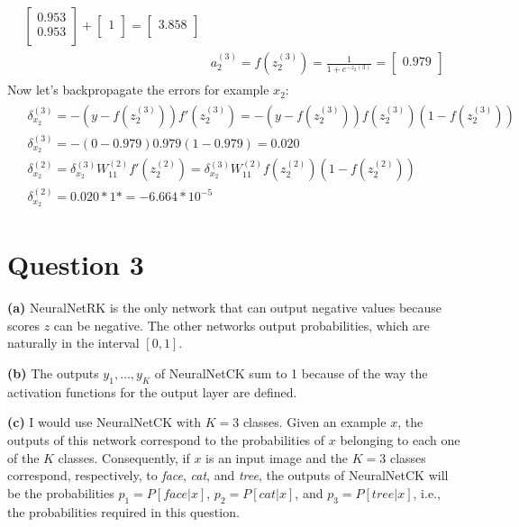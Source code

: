 \documentclass[leqno]{article}
\begin{document}
\begin{gather*}
\begin{split}
 \begin{bmatrix}
   0.953\\
   0.953\\ 
  \end{bmatrix} 
  +
   \begin{bmatrix}
   1\\
  \end{bmatrix}
  =
 \begin{bmatrix}
   3.858\\ 
  \end{bmatrix}
\\
&a_2^{(3)} = f(z_2^{(3)}) = \frac{1}{1 + e^{-z_2{(3)}}} =
 \begin{bmatrix}
   0.979\\ 
  \end{bmatrix}
\end{split}
\end{gather*}
Now let's backpropagate the errors for example $x_2$:
\begin{gather*}
\begin{split}
&\delta_{x_2}^{(3)} = -(y - f(z_2^{(3)}))f'(z_2^{(3)}) = -(y - f(z_2^{(3)}))f(z_2^{(3)})(1 - f(z_2^{(3)}))\\
&\delta_{x_2}^{(3)} = -(0 - 0.979)0.979(1 - 0.979) = 0.020\\
&\delta_{x_2}^{(2)} = \delta_{x_2}^{(3)}W_{11}^{(2)}f'(z_2^{(2)}) = \delta_{x_2}^{(3)}W_{11}^{(2)}f(z_2^{(2)})(1 - f(z_2^{(2)}))\\
&\delta_{x_2}^{(2)} = 0.020*1* = -6.664*10^{-5}
\end{split}
\end{gather*}


\hfill
\section*{Question 3} \textbf{(a)} NeuralNetRK is the only network that can output negative values because scores $z$ can be negative. The other 
networks output probabilities, which are naturally in the interval $[0,1]$.

\hfill

\noindent \textbf{(b)} The outputs $y_1, \ldots, y_K$ of NeuralNetCK sum to 1 because of the way the activation functions for the output layer are defined. 

\hfill

\noindent \textbf{(c)} I would use NeuralNetCK with $K = 3$ classes. Given an example $x$, the outputs of this network correspond to the probabilities of $x$ belonging to 
 each one of the $K$ classes. Consequently, if $x$ is an input image and the $K = 3$ classes correspond, respectively, to \textit{face}, \textit{cat}, and \textit{tree}, the 
outputs of NeuralNetCK will be the probabilities $p_1 = P[face|x]$, $p_2 = P[cat|x]$, and $p_3 = P[tree|x]$, i.e., the probabilities required in this question. 
\end{document}

